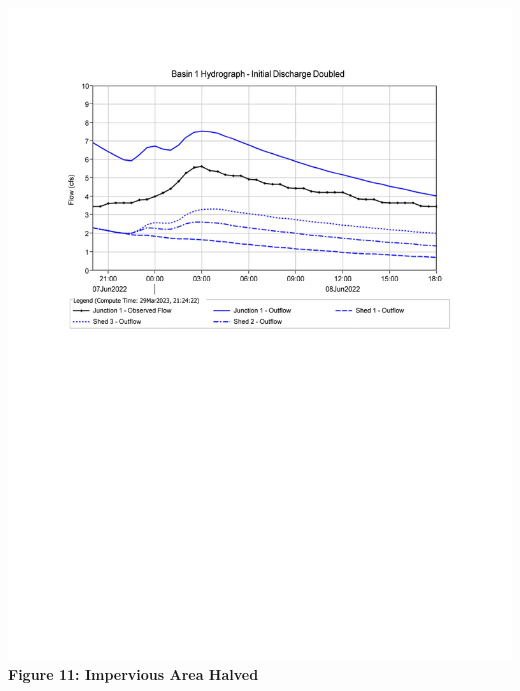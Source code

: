 \documentclass{article}
\begin{document}
\begin{center}
    \includegraphics*[scale=0.7, trim = {0 13cm 0 3.1cm}]{results/Basin_1_Hydrograph_-_Initial_Discharge_Doubled.pdf}
    \newpage
    {\large{\bf Figure 11: Impervious Area Halved\\}}

\end{center}
\end{document}

